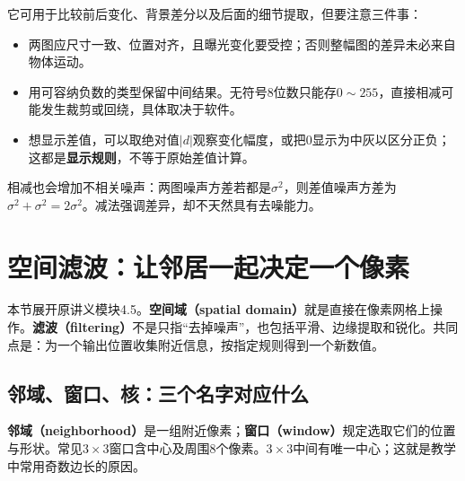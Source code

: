 它可用于比较前后变化、背景差分以及后面的细节提取，但要注意三件事：
\begin{itemize}
  \item 两图应尺寸一致、位置对齐，且曝光变化要受控；否则整幅图的差异未必来自物体运动。
  \item 用可容纳负数的类型保留中间结果。无符号8位数只能存$0\sim255$，直接相减可能发生裁剪或回绕，具体取决于软件。
  \item 想显示差值，可以取绝对值$|d|$观察变化幅度，或把0显示为中灰以区分正负；这都是\textbf{显示规则}，不等于原始差值计算。
\end{itemize}
相减也会增加不相关噪声：两图噪声方差若都是$\sigma^2$，则差值噪声方差为$\sigma^2+\sigma^2=2\sigma^2$。减法强调差异，却不天然具有去噪能力。

\section{空间滤波：让邻居一起决定一个像素}
\label{sec:spatial-filter-beginner}
本节展开原讲义模块4.5。\textbf{空间域（spatial domain）}就是直接在像素网格上操作。\textbf{滤波（filtering）}不是只指“去掉噪声”，也包括平滑、边缘提取和锐化。共同点是：为一个输出位置收集附近信息，按指定规则得到一个新数值。

\subsection{邻域、窗口、核：三个名字对应什么}
\textbf{邻域（neighborhood）}是一组附近像素；\textbf{窗口（window）}规定选取它们的位置与形状。常见$3\times3$窗口含中心及周围8个像素。$3\times3$中间有唯一中心；这就是教学中常用奇数边长的原因。

